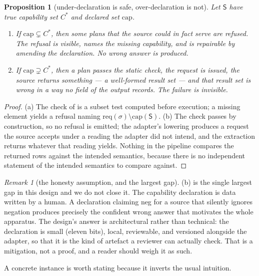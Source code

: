 \documentclass[11pt,a4paper]{article}
\theoremstyle{plain}
\newtheorem{proposition}[theorem]{Proposition}
\theoremstyle{definition}
\theoremstyle{remark}
\newtheorem{remark}[theorem]{Remark}
\newcommand{\Step}{\sigma}
\newcommand{\Src}{\mathsf{S}}
\newcommand{\Capset}{\mathrm{cap}}
\newcommand{\Req}{\mathrm{req}}
\begin{document}
\begin{proposition}[under-declaration is safe, over-declaration is not]
\label{prop:honest}
Let $\Src$ have true capability set $C^{\ast}$ and declared set
$\Capset$.
\begin{enumerate}[label=(\alph*),leftmargin=2.2em]
\item If $\Capset \subsetneq C^{\ast}$, then some plans that the source
  could in fact serve are refused. The refusal is visible, names the
  missing capability, and is repairable by amending the declaration. No
  wrong answer is produced.
\item If $\Capset \supsetneq C^{\ast}$, then a plan passes the static
  check, the request is issued, the source returns something --- a
  well-formed result set --- and that result set is wrong in a way no
  field of the output records. The failure is invisible.
\end{enumerate}
\end{proposition}

\begin{proof}
(a) The check of  is a subset test computed before
execution; a missing element yields a refusal naming
$\Req(\Step) \setminus \Capset(\Src)$. (b) The check passes by
construction, so no refusal is emitted; the adapter's lowering produces
a request the source accepts under a reading the adapter did not intend,
and the extraction returns whatever that reading yields. Nothing in the
pipeline compares the returned rows against the intended semantics,
because there is no independent statement of the intended semantics to
compare against.
\end{proof}

\begin{remark}[the honesty assumption, and the largest gap]
\label{rem:honesty}
(b) is the single largest gap in this design and we do
not close it. The capability declaration is data written by a human. A
declaration claiming \textsf{neg} for a source that silently ignores
negation produces precisely the confident wrong answer that motivates
the whole apparatus. The design's answer is architectural rather than
technical: the declaration is small (eleven bits), local, reviewable,
and versioned alongside the adapter, so that it is the kind of artefact
a reviewer can actually check. That is a mitigation, not a proof, and a
reader should weigh it as such.
\end{remark}

A concrete instance is worth stating because it inverts the usual
intuition.
\end{document}
